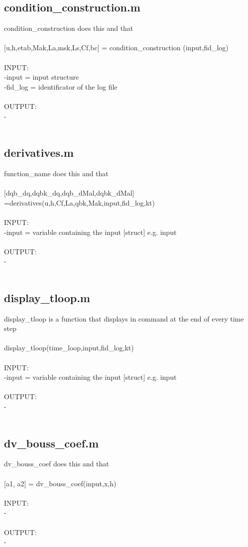 \subsection{condition\_construction.m}
condition\_construction does this and that \\ 
 \\ 
$[$u,h,etab,Mak,La,msk,Ls,Cf,bc$]$ = condition\_construction (input,fid\_log) \\ 
 \\ 
INPUT: \\ 
   -input = input structure \\ 
   -fid\_log = identificator of the log file \\ 
 \\ 
OUTPUT: \\ 
   - \\ 
 \\ 
\subsection{derivatives.m}
function\_name does this and that \\ 
 \\ 
$[$dqb\_dq,dqbk\_dq,dqb\_dMal,dqbk\_dMal$]$=derivatives(u,h,Cf,La,qbk,Mak,input,fid\_log,kt) \\ 
 \\ 
INPUT: \\ 
   -input = variable containing the input $[$struct$]$ e.g. input \\ 
 \\ 
OUTPUT: \\ 
   - \\ 
 \\ 
\subsection{display\_tloop.m}
display\_tloop is a function that displays in command at the end of every time step \\ 
 \\ 
display\_tloop(time\_loop,input,fid\_log,kt) \\ 
 \\ 
INPUT: \\ 
   -input = variable containing the input $[$struct$]$ e.g. input \\ 
 \\ 
OUTPUT: \\ 
   - \\ 
 \\ 
\subsection{dv\_bouss\_coef.m}
dv\_bouss\_coef does this and that \\ 
 \\ 
$[$a1, a2$]$ = dv\_bouss\_coef(input,x,h) \\ 
 \\ 
INPUT: \\ 
   - \\ 
 \\ 
OUTPUT: \\ 
   - \\ 
 \\ 
